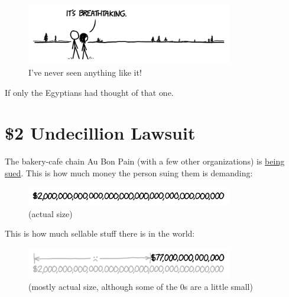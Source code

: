 {\begin{figure}[!htbp]
\centering
\includegraphics[scale=0.5, max width=0.8\textwidth]{imgs/a/95/pyramid_german.png}
\caption{I've never seen anything like it!}
\end{figure}

{If only the Egyptians had thought of that one.}

{
\chapter{\$2 Undecillion Lawsuit}
}

\hfill{}

{The bakery-cafe chain Au Bon Pain (with a few other organizations) is \href{http://www.loweringthebar.net/2014/05/2-undecillion-dollar-demand.html}{being sued}. This is how much money the person suing them is demanding:}

\begin{figure}[!htbp]
\centering
\includegraphics[scale=0.5, max width=0.8\textwidth]{imgs/a/96/1ud.png}
\caption{(actual size)}
\end{figure}

{This is how much sellable stuff there is in the world:}

\begin{figure}[!htbp]
\centering
\includegraphics[scale=0.5, max width=0.8\textwidth]{imgs/a/96/world.png}
\caption{(mostly actual size, although some of the 0s are a little small)}
\end{figure}

}
